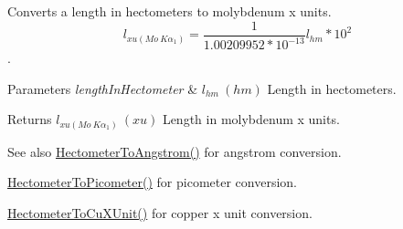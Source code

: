 Converts a length in hectometers to molybdenum x units. \[ l_{xu(Mo\ K\alpha_1)}=\frac{1}{1.00209952*10^{-13}} l_{hm} * 10^{2}\]. 


\begin{DoxyParams}{Parameters}
{\em length\+In\+Hectometer} & $ l_{hm}\ (hm)$ Length in hectometers. \\
\hline
\end{DoxyParams}
\begin{DoxyReturn}{Returns}
$ l_{xu(Mo\ K\alpha_1)}\ (xu)$ Length in molybdenum x units. 
\end{DoxyReturn}
\begin{DoxySeeAlso}{See also}
\mbox{\hyperlink{group___e_g_x_math-_conversions-_length_conversions-_hectometer-_non-_s_i_gad1296c0169aa8a99802a30b65a2ea516}{Hectometer\+To\+Angstrom()}} for angstrom conversion. 

\mbox{\hyperlink{group___e_g_x_math-_conversions-_length_conversions-_hectometer-_s_i_gaa45a09cd750ee4e48680332f0ce39f07}{Hectometer\+To\+Picometer()}} for picometer conversion. 

\mbox{\hyperlink{group___e_g_x_math-_conversions-_length_conversions-_hectometer-_non-_s_i_ga5c1d570e3bec185a917f3987d45529be}{Hectometer\+To\+Cu\+X\+Unit()}} for copper x unit conversion. 
\end{DoxySeeAlso}
